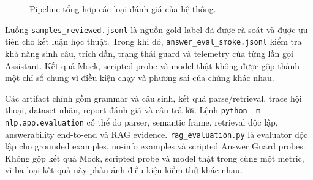 \begin{figure}[htbp]
{}
\caption{Pipeline tổng hợp các loại đánh giá của hệ thống.}
\label{fig:implementation-evaluation-flow}
\end{figure}

Luồng \texttt{samples\_reviewed.jsonl} là nguồn gold label đã được rà soát và được ưu tiên cho kết luận học thuật. Trong khi đó, \texttt{answer\_eval\_smoke.jsonl} kiểm tra khả năng sinh câu, trích dẫn, trạng thái guard và telemetry của từng lần gọi Assistant. Kết quả Mock, scripted probe và model thật không được gộp thành một chỉ số chung vì điều kiện chạy và phương sai của chúng khác nhau.

Các artifact chính gồm grammar và câu sinh, kết quả parse/retrieval, trace hội thoại, dataset nhãn, report đánh giá và câu trả lời. Lệnh \texttt{python -m nlp.app.evaluation} có thể đo parser, semantic frame, retrieval độc lập, answerability end-to-end và RAG evidence. \texttt{rag\_evaluation.py} là evaluator độc lập cho grounded examples, no-info examples và scripted Answer Guard probes. Không gộp kết quả Mock, scripted probe và model thật trong cùng một metric, vì ba loại kết quả này phản ánh điều kiện kiểm thử khác nhau.

